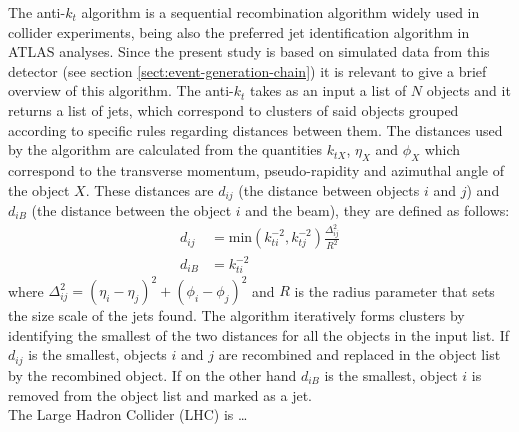 \documentclass[main]{subfiles} %
\begin{document}
The anti-$k_t$ algorithm \cite{Cacciari2008} is a sequential recombination algorithm widely used in collider experiments, being also the preferred jet identification algorithm in ATLAS analyses. Since the present study is based on simulated data from this detector (see section \ref{sect:event-generation-chain}) it is relevant to give a brief overview of this algorithm. The anti-$k_t$ takes as an input a list of $N$ objects and it returns a list of jets, which correspond to clusters of said objects grouped according to specific rules regarding distances between them. The distances used by the algorithm are calculated from the quantities $k_{tX}$, $\eta_X$ and $\phi_X$ which correspond to the transverse momentum, pseudo-rapidity and azimuthal angle of the object $X$. These distances are $d_{ij}$ (the distance between objects $i$ and $j$) and $d_{iB}$ (the distance between the object $i$ and the beam), they are defined as follows:
\begin{align}
  d_{ij} &= \text{min}(k_{ti}^{-2},k_{tj}^{-2})\frac{\Delta_{ij}^2}{R^2}\\
  d_{iB} &= k_{ti}^{-2}
\end{align}
where $\Delta_{ij}^2 = (\eta_i - \eta_j)^2 + (\phi_i - \phi_j)^2$ and $R$ is the radius parameter that sets the size scale of the jets found. The algorithm iteratively forms clusters by identifying the smallest of the two distances for all the objects in the input list. If $d_{ij}$ is the smallest, objects $i$ and $j$ are recombined and replaced in the object list by the recombined object. If on the other hand $d_{iB}$ is the smallest, object $i$ is removed from the object list and marked as a jet.\\


\vspace{15pt}
The Large Hadron Collider (LHC) is \dots

\vspace{15pt}

\vspace{15pt}

\vspace{15pt}

\vspace{15pt}

\vspace{15pt}



















\biblio
\end{document}

